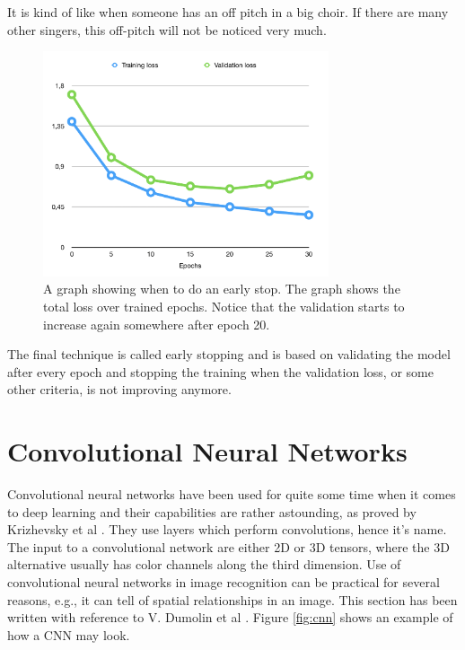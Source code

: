 It is kind of like when someone has an off pitch in a big choir. If there are many other singers, this off-pitch will not be noticed very much.

\begin{figure}[hbtp]
\begin{center}
\includegraphics[width = 0.75\textwidth]{./Images/early_stop.jpg} 
\caption{A graph showing when to do an early stop. The graph shows the total loss over trained epochs. Notice that the validation starts to increase again somewhere after epoch 20.}
\end{center}
\end{figure}

The final technique is called early stopping and is based on validating the model after every epoch and stopping the training when the validation loss, or some other criteria, is not improving anymore.


 \section{Convolutional Neural Networks}

 Convolutional neural networks have been used for quite some time when it comes to deep learning and their capabilities are rather astounding, as proved by Krizhevsky et al \cite{NIPS2012_4824}.  They use layers which perform convolutions, hence it's name.  The input to a convolutional network are either 2D or 3D tensors, where the 3D alternative usually has color channels along the third dimension. Use of convolutional neural networks in image recognition  can be practical for several reasons, e.g., it can tell of spatial relationships in an image. This section has been written with reference to V. Dumolin et al \cite{convArit}. Figure \ref{fig:cnn} shows an example of how a CNN may look.
 
